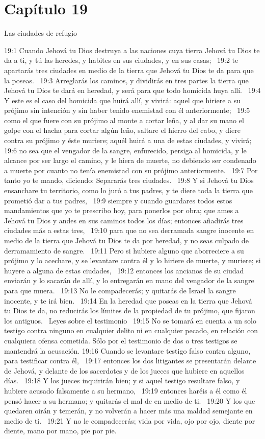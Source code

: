 \section*{Capítulo 19}
Las ciudades de refugio  

19:1 Cuando Jehová tu Dios destruya a las naciones cuya tierra Jehová tu Dios te da a ti, y tú las heredes, y habites en sus ciudades, y en sus casas;  
19:2 te apartarás tres ciudades en medio de la tierra que Jehová tu Dios te da para que la poseas.  
19:3 Arreglarás los caminos, y dividirás en tres partes la tierra que Jehová tu Dios te dará en heredad, y será para que todo homicida huya allí.  
19:4 Y este es el caso del homicida que huirá allí, y vivirá: aquel que hiriere a su prójimo sin intención y sin haber tenido enemistad con él anteriormente;  
19:5 como el que fuere con su prójimo al monte a cortar leña, y al dar su mano el golpe con el hacha para cortar algún leño, saltare el hierro del cabo, y diere contra su prójimo y éste muriere; aquél huirá a una de estas ciudades, y vivirá;  
19:6 no sea que el vengador de la sangre, enfurecido, persiga al homicida, y le alcance por ser largo el camino, y le hiera de muerte, no debiendo ser condenado a muerte por cuanto no tenía enemistad con su prójimo anteriormente.  
19:7 Por tanto yo te mando, diciendo: Separarás tres ciudades.  
19:8 Y si Jehová tu Dios ensanchare tu territorio, como lo juró a tus padres, y te diere toda la tierra que prometió dar a tus padres,  
19:9 siempre y cuando guardares todos estos mandamientos que yo te prescribo hoy, para ponerlos por obra; que ames a Jehová tu Dios y andes en sus caminos todos los días; entonces añadirás tres ciudades más a estas tres,  
19:10 para que no sea derramada sangre inocente en medio de la tierra que Jehová tu Dios te da por heredad, y no seas culpado de derramamiento de sangre.  
19:11 Pero si hubiere alguno que aborreciere a su prójimo y lo acechare, y se levantare contra él y lo hiriere de muerte, y muriere; si huyere a alguna de estas ciudades,  
19:12 entonces los ancianos de su ciudad enviarán y lo sacarán de allí, y lo entregarán en mano del vengador de la sangre para que muera.  
19:13 No le compadecerás; y quitarás de Israel la sangre inocente, y te irá bien.  
19:14 En la heredad que poseas en la tierra que Jehová tu Dios te da, no reducirás los límites de la propiedad de tu prójimo, que fijaron los antiguos.  
Leyes sobre el testimonio  
19:15 No se tomará en cuenta a un solo testigo contra ninguno en cualquier delito ni en cualquier pecado, en relación con cualquiera ofensa cometida. Sólo por el testimonio de dos o tres testigos se mantendrá la acusación. 
19:16 Cuando se levantare testigo falso contra alguno, para testificar contra él,  
19:17 entonces los dos litigantes se presentarán delante de Jehová, y delante de los sacerdotes y de los jueces que hubiere en aquellos días.  
19:18 Y los jueces inquirirán bien; y si aquel testigo resultare falso, y hubiere acusado falsamente a su hermano,  
19:19 entonces haréis a él como él pensó hacer a su hermano; y quitarás el mal de en medio de ti.  
19:20 Y los que quedaren oirán y temerán, y no volverán a hacer más una maldad semejante en medio de ti.  
19:21 Y no le compadecerás; vida por vida, ojo por ojo, diente por diente, mano por mano, pie por pie.  
